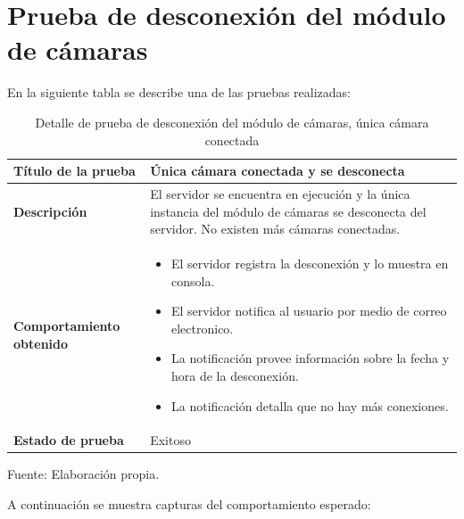 \section{Prueba de desconexión del módulo de cámaras}

En la siguiente tabla se describe una de las pruebas realizadas:

\begin{table}[H]
    \caption{Detalle de prueba de desconexión del módulo de cámaras, única cámara conectada}
    \begin{center}
        \begin{tabular}{|>{\centering}p{}|m{}<{\centering}|} 
            \hline
            \textbf{Título de la prueba} & Única cámara conectada y se desconecta \\
            \hline
            \textbf{Descripción} & El servidor se encuentra en ejecución y la única instancia del módulo de cámaras se desconecta del servidor. No existen más cámaras conectadas.\\
            \hline
            \textbf{Comportamiento obtenido} & 
            \begin{itemize}
                \item El servidor registra la desconexión y lo muestra en consola.
                \item El servidor notifica al usuario por medio de correo electronico.
                \item La notificación provee información sobre la fecha y hora de la desconexión.
                \item La notificación detalla que no hay más conexiones.
            \end{itemize} \\ 
            \hline
            \textbf{Estado de prueba} & Exitoso \\
            \hline
        \end{tabular}
    \end{center}
    \begin{center}
        Fuente: Elaboración propia.
    \end{center}
\end{table}

A continuación se muestra capturas del comportamiento esperado:

